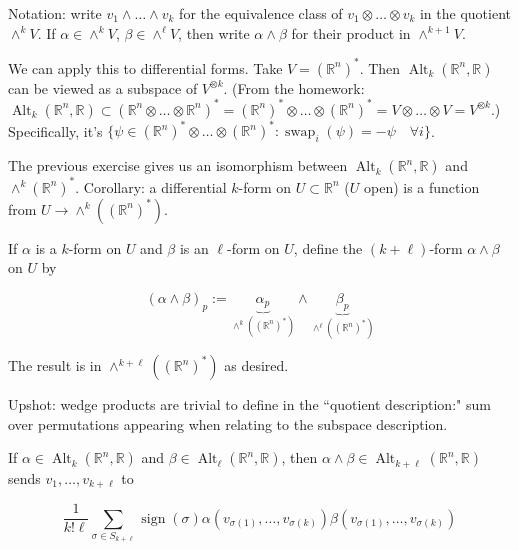 Notation: write \(v_1 \wedge \ldots \wedge v_k\) for the equivalence class of \(v_1 \otimes \ldots \otimes v_k\) in the quotient \(\wedge^k V\). If \(\alpha \in \wedge^k V\), \(\beta \in \wedge^\ell V\), then write \(\alpha \wedge \beta\) for their product in \(\wedge^{k+1} V\). 

We can apply this to differential forms. Take \(V = (\mathbb{R}^n)^*\). Then \(\operatorname{Alt}_k(\mathbb{R}^n, \mathbb{R})\) can be viewed as a subspace of \(V^{\otimes k}\). (From the homework: \(\operatorname{Alt}_k(\mathbb{R}^n, \mathbb{R}) \subset (\mathbb{R}^n \otimes \ldots \otimes \mathbb{R}^n)^* = (\mathbb{R}^n)^* \otimes \ldots \otimes (\mathbb{R}^n)^* = V \otimes \ldots \otimes V = V^{\otimes k}\).) Specifically, it's \(\{\psi \in (\mathbb{R}^n)^* \otimes \ldots \otimes (\mathbb{R}^n)^*: \operatorname{swap}_i(\psi) = -\psi \quad \forall i\}\). 

The previous exercise gives us an isomorphism between \(\operatorname{Alt}_k(\mathbb{R}^n, \mathbb{R})\) and \(\wedge^k(\mathbb{R}^n)^*\). Corollary: a differential \(k\)-form on \(U \subset \mathbb{R}^n\) (\(U\) open) is a function from \(U \to \wedge^k((\mathbb{R}^n)^*)\). 

\begin{definition}

If \(\alpha\) is a \(k\)-form on \(U\) and \(\beta\) is an \(\ell\)-form on \(U\), define the \((k + \ell)\)-form \(\alpha \wedge \beta\) on \(U\) by

\[
(\alpha \wedge \beta)_p := \underbrace{\alpha_p}_{\wedge^k((\mathbb{R}^n)^*)} \wedge \underbrace{\beta_p}_{\wedge^\ell((\mathbb{R}^n)^*)}
\]

The result is in \(\wedge^{k+\ell}((\mathbb{R}^n)^*)\) as desired.

\end{definition}

Upshot: wedge products are trivial to define in the ``quotient description:" sum over permutations appearing when relating to the subspace description. 

\begin{corollary}

If \(\alpha \in \operatorname{Alt}_k(\mathbb{R}^n, \mathbb{R}) \) and \(\beta \in \operatorname{Alt}_\ell(\mathbb{R}^n, \mathbb{R})\), then \(\alpha \wedge \beta \in \operatorname{Alt}_{k+\ell}(\mathbb{R}^n, \mathbb{R})\) sends \(v_1, \ldots, v_{k+\ell}\) to 

\[
\frac{1}{k! \ell} \sum_{\sigma \in S_{k + \ell}} \operatorname{sign}(\sigma) \alpha(v_{\sigma(1)}, \ldots, v_{\sigma(k)}) \beta(v_{\sigma(1)}, \ldots, v_{\sigma(k)}) 
\]



\end{corollary}


